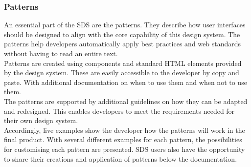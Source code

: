 \subsubsection*{Patterns}
An essential part of the SDS are the patterns. They describe how user interfaces should be designed to align with the core capability of this design system. The patterns help developers automatically apply best practices and web standards without having to read an entire text. \\
Patterns are created using components and standard HTML elements provided by the design system. These are easily accessible to the developer by copy and paste. With additional documentation on when to use them and when not to use them. \\
The patterns are supported by additional guidelines on how they can be adapted and redesigned. This enables developers to meet the requirements needed for their own design system.\\
Accordingly, live examples show the developer how the patterns will work in the final product. With several different examples for each pattern, the possibilities for customising each pattern are presented. SDS users also have the opportunity to share their creations and application of patterns below the documentation. 
